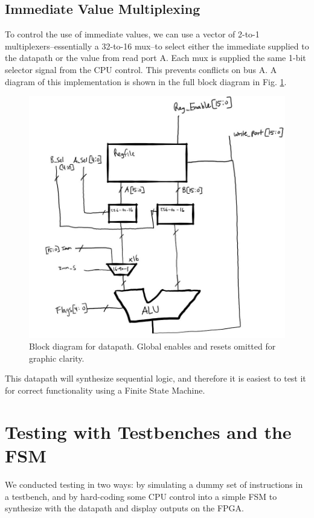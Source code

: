 \documentclass[conference]{IEEEtran}
\begin{document}
\subsection{Immediate Value Multiplexing}
To control the use of immediate values, we can use a vector of 2-to-1 multiplexers--essentially a 32-to-16 mux--to select either the immediate supplied to the datapath or the value from read port A. Each mux is supplied the same 1-bit selector signal from the CPU control. This prevents conflicts on bus A. A diagram of this implementation is shown in the full block diagram in Fig. \ref{fig:datapath_block_diagram}.

\begin{figure}[h]
    \centering
    \includegraphics[scale=0.45]{resources/figures/block_diagram_datapath.JPG}
    \caption{Block diagram for datapath. Global enables and resets omitted for graphic clarity.}
    \label{fig:datapath_block_diagram}
\end{figure}

This datapath will synthesize sequential logic, and therefore it is easiest to test it for correct functionality using a Finite State Machine.

\section{Testing with Testbenches and the FSM}
We conducted testing in two ways: by simulating a dummy set of instructions in a testbench, and by hard-coding some CPU control into a simple FSM to synthesize with the datapath and display outputs on the FPGA.
\end{document}
